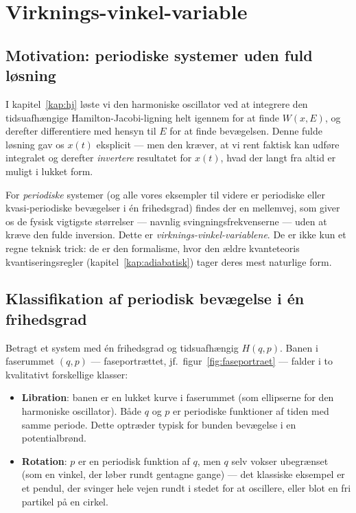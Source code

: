 
\chapter{Virknings-vinkel-variable}
\label{kap:virkning-vinkel}

\section{Motivation: periodiske systemer uden fuld løsning}

I kapitel~\ref{kap:hj} løste vi den harmoniske oscillator ved at
integrere den tidsuafhængige Hamilton-Jacobi-ligning helt igennem for
at finde $W(x,E)$, og derefter differentiere med hensyn til $E$ for at
finde bevægelsen. Denne fulde løsning gav os $x(t)$ eksplicit — men den
kræver, at vi rent faktisk kan udføre integralet og derefter
\emph{invertere} resultatet for $x(t)$, hvad der langt fra altid er
muligt i lukket form.

For \emph{periodiske} systemer (og alle vores eksempler til videre er
periodiske eller kvasi-periodiske bevægelser i én frihedsgrad) findes
der en mellemvej, som giver os de fysisk vigtigste størrelser —
navnlig svingningsfrekvenserne — uden at kræve den fulde inversion.
Dette er \emph{virknings-vinkel-variablene}. De er ikke kun et regne\-
teknisk trick: de er den formalisme, hvor den ældre kvanteteoris
kvantiseringsregler (kapitel~\ref{kap:adiabatisk}) tager deres mest
naturlige form.

\section{Klassifikation af periodisk bevægelse i én frihedsgrad}

Betragt et system med én frihedsgrad og tidsuafhængig $H(q,p)$. Banen i
faserummet $(q,p)$ — faseportrættet, jf.\ figur~\ref{fig:faseportraet}
— falder i to kvalitativt forskellige klasser:

\begin{itemize}
  \item \textbf{Libration}: banen er en lukket kurve i faserummet (som
        ellipserne for den harmoniske oscillator). Både $q$ og $p$ er
        periodiske funktioner af tiden med samme periode. Dette
        optræder typisk for bunden bevægelse i en potentialbrønd.
  \item \textbf{Rotation}: $p$ er en periodisk funktion af $q$, men
        $q$ selv vokser ubegrænset (som en vinkel, der løber
        rundt gentagne gange) — det klassiske eksempel er et
        pendul, der svinger hele vejen rundt i stedet for at
        oscillere, eller blot en fri partikel på en cirkel.
\end{itemize}

